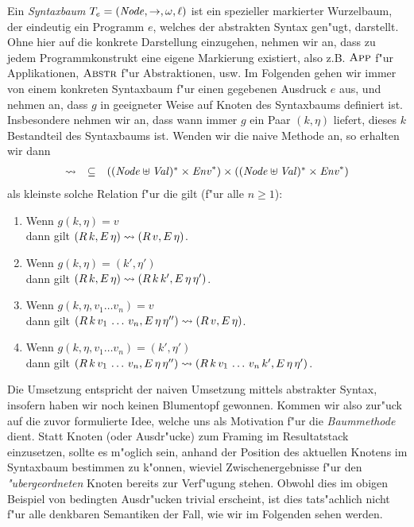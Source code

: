 \documentclass[12pt,a4paper]{article}
\begin{document}
Ein \emph{Syntaxbaum} $T_e = (\mathit{Node},\to,\omega,\ell)$ ist ein spezieller markierter Wurzelbaum, der
eindeutig ein Programm $e$, welches
der abstrakten Syntax gen"ugt, darstellt. Ohne hier auf die konkrete Darstellung einzugehen, nehmen
wir an, dass zu jedem Programmkonstrukt eine eigene Markierung existiert, also z.B. $\textsc{App}$
f"ur Applikationen, $\textsc{Abstr}$ f"ur Abstraktionen, usw. Im Folgenden gehen wir immer von einem
konkreten Syntaxbaum f"ur einen gegebenen Ausdruck $e$ aus, und nehmen an, dass $g$ in geeigneter
Weise auf Knoten des Syntaxbaums definiert ist. Insbesondere nehmen wir an, dass wann immer $g$
ein Paar $(k,\eta)$ liefert, dieses $k$ Bestandteil des Syntaxbaums ist. Wenden wir die naive
Methode an, so erhalten wir dann
\[\begin{array}{rcl}
  \rightsquigarrow &\subseteq& ((\mathit{Node} \uplus \mathit{Val})^* \times \mathit{Env}^*) \times ((\mathit{Node} \uplus \mathit{Val})^* \times \mathit{Env}^*)
\end{array}\]
als kleinste solche Relation f"ur die gilt (f"ur alle $n \ge 1$):
\begin{enumerate}
\item Wenn $g(k,\eta) = v$ \\
  dann gilt $(R\,k,E\,\eta) \rightsquigarrow (R\,v,E\,\eta)$.
\item Wenn $g(k,\eta) = (k',\eta')$ \\
  dann gilt $(R\,k,E\,\eta) \rightsquigarrow (R\,k\,k',E\,\eta\,\eta')$.
\item Wenn $g(k,\eta,v_1 \ldots v_n) = v$ \\
  dann gilt $(R\,k\,v_1\,\ldots\,v_n,E\,\eta\,\eta'') \rightsquigarrow (R\,v,E\,\eta)$.
\item Wenn $g(k,\eta,v_1 \ldots v_n) = (k',\eta')$ \\
  dann gilt $(R\,k\,v_1\,\ldots\,v_n,E\,\eta\,\eta'') \rightsquigarrow (R\,k\,v_1\,\ldots\,v_n\,k',E\,\eta\,\eta')$.
\end{enumerate}
Die Umsetzung entspricht der naiven Umsetzung mittels abstrakter Syntax, insofern haben wir noch keinen
Blumentopf gewonnen. Kommen wir also zur"uck auf die zuvor formulierte Idee, welche uns als Motivation
f"ur die \emph{Baummethode} dient. Statt Knoten (oder Ausdr"ucke) zum Framing im Resultatstack einzusetzen,
sollte es m"oglich sein, anhand der Position des aktuellen Knotens im Syntaxbaum bestimmen zu k"onnen,
wieviel Zwischenergebnisse f"ur den \emph{"ubergeordneten} Knoten bereits zur Verf"ugung stehen. Obwohl
dies im obigen Beispiel von bedingten Ausdr"ucken trivial erscheint, ist dies tats"achlich nicht f"ur alle
denkbaren Semantiken der Fall, wie wir im Folgenden sehen werden.
\end{document}
